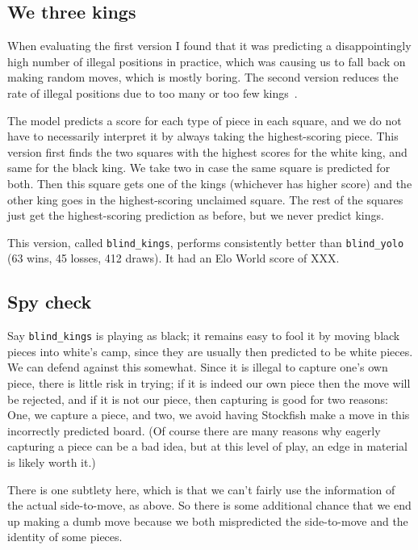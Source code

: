 \documentclass[twocolumn]{amsart}
\begin{document}
\subsection{We three kings}

When evaluating the first version I found that it was predicting a
disappointingly high number of illegal positions in practice, which
was causing us to fall back on making random moves, which is mostly
boring. The second version reduces the rate of illegal positions due
to too many or too few kings~\cite{kingme}.

The model predicts a score for each type of piece in each square,
and we do not have to necessarily interpret it by always taking
the highest-scoring piece. This version first finds the two squares
with the highest scores for the white king, and same for the black
king. We take two in case the same square is predicted for both.
Then this square gets one of the kings (whichever has higher score)
and the other king goes in the highest-scoring unclaimed square. The
rest of the squares just get the highest-scoring prediction as before,
but we never predict kings.

This version, called \verb+blind_kings+, performs consistently better
than \verb+blind_yolo+ (63 wins, 45 losses, 412 draws).
It had an Elo World score of XXX.

\subsection{Spy check}

Say \verb+blind_kings+ is playing as black; it remains easy to fool it
by moving black pieces into white's camp, since they are usually then
predicted to be white pieces. We can defend against this somewhat.
Since it is illegal to capture one's own piece, there is little risk
in trying; if it is indeed our own piece then the move will be
rejected, and if it is not our piece, then capturing is good for two
reasons: One, we capture a piece, and two, we avoid having
Stockfish make a move in this incorrectly predicted board. (Of course
there are many reasons why eagerly capturing a piece can be a bad
idea, but at this level of play, an edge in material is likely worth
it.)

There is one subtlety here, which is that we can't fairly use the
information of the actual side-to-move, as above. So there is some
additional chance that we end up making a dumb move because we
both mispredicted the side-to-move and the identity of some pieces.
\end{document}
